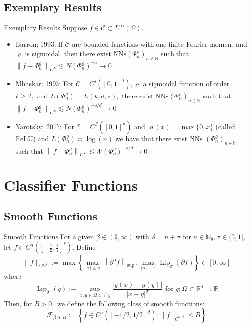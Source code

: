 \documentclass{if-beamer}
\begin{document}
\subsection{Exemplary Results}
\begin{frame}{Exemplary Results}
    Suppose $f \in \mathcal{C} \subset L^{\infty}(\Omega)$.
    \begin{itemize}
        \item Barron; 1993: If $\mathcal{C}$ are bounded functions with one finite Fourier moment and $\varrho$ is sigmoidal, then there exist $\mathrm{NNs}\left(\Phi_{n}^{\rho}\right)_{n \in \mathbb{N}}$ such that $\left\|f-\Phi_{n}^{\varrho}\right\|_{L^{\infty}} \lesssim N\left(\Phi_{n}^{\varrho}\right)^{-1} \rightarrow 0$
        \item Mhaskar; 1993: For $\mathcal{C}=C^{s}\left([0,1]^{d}\right), \varrho$ a sigmoidal function of order $k \geq 2,$ and $L\left(\Phi_{n}^{\varrho}\right)=L(k, d, s),$ there exist $\mathrm{NNs}\left(\Phi_{n}^{\rho}\right)_{n \in \mathbb{N}}$ such that $\left\|f-\Phi_{n}^{\varrho}\right\|_{L^{\infty}} \lesssim N\left(\Phi_{n}^{\varrho}\right)^{-s / d} \rightarrow 0$
        \item Yarotsky; 2017: For $\mathcal{C}=C^{S}\left([0,1]^{d}\right)$ and $\varrho(x)=\max \{0, x\}$
        (called ReLU) and $L\left(\Phi_{n}^{\varrho}\right) \asymp \log (n)$ we have that there exist $\mathrm{NNs}$
        $\left(\Phi_{n}^{\varrho}\right)_{n \in \mathbb{N}}$ such that $\left\|f-\Phi_{n}^{\varrho}\right\|_{L^{\infty}} \lesssim W\left(\Phi_{n}^{\varrho}\right)^{-s / d} \rightarrow 0$
    \end{itemize}
\end{frame}

\section{Classifier Functions}
\subsection{Smooth Functions}
\begin{frame}{Smooth Functions}
    For a given $\beta \in (0,\infty)$ with $\beta = n + \sigma$ for $n \in \mathbb{N}_0, \sigma \in (0,1]$, let $f \in C^n([-\frac{1}{2}, \frac{1}{2}]^r)$. Define $$\|f\|_{C^{0, \beta}}:=\max \left\{\max _{|\alpha| \leq n}\left\|\partial^{\alpha} f\right\|_{\text {sup }}, \max _{|\alpha|=n} \operatorname{Lip}_{\sigma}(\partial f)\right\} \in[0, \infty] $$
    where \[
    \operatorname{Lip}_{\sigma}(g):=\sup _{x, y \in \Omega, x \neq y} \frac{|g(x)-g(y)|}{|x-y|^{\sigma}} \text { for } g: \Omega \subset \mathbb{R}^{d} \rightarrow \mathbb{R}
    \]
    Then, for $B>0,$ we define the following class of smooth functions:
    \[
    \mathcal{F}_{\beta, d, B}:=\left\{f \in C^{n}\left([-1 / 2,1 / 2]^{d}\right):\|f\|_{C^{0, \beta}} \leq B\right\}
    \]
\end{frame}
\end{document}
